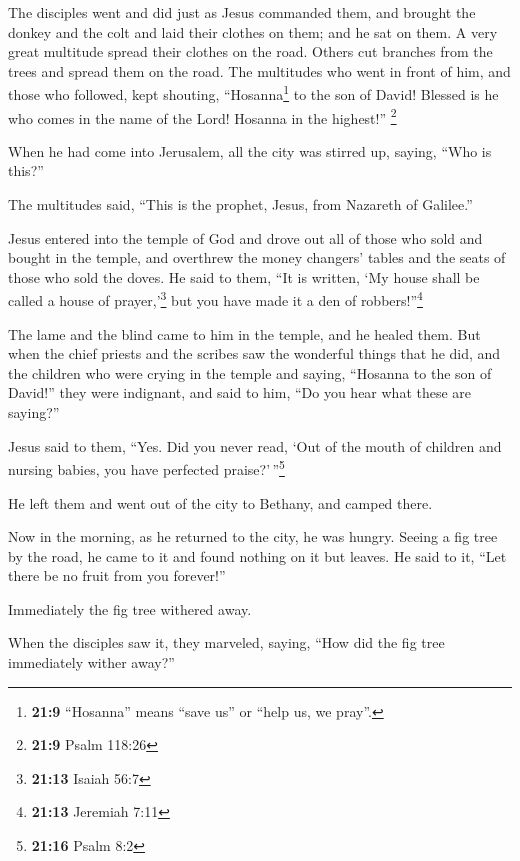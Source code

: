  The disciples went and did just as Jesus commanded them,
 and brought the donkey and the colt and laid their
clothes on them; and he sat on them.  A very great
multitude spread their clothes on the road. Others cut branches from the
trees and spread them on the road.  The multitudes who
went in front of him, and those who followed, kept shouting,
``Hosanna\footnote{\textbf{21:9} ``Hosanna'' means ``save us'' or ``help
  us, we pray''.} to the son of David! Blessed is he who comes in the
name of the Lord! Hosanna in the highest!'' \footnote{\textbf{21:9}
  Psalm 118:26}

 When he had come into Jerusalem, all the city was
stirred up, saying, ``Who is this?''

 The multitudes said, ``This is the prophet, Jesus, from
Nazareth of Galilee.''

 Jesus entered into the temple of God and drove out all
of those who sold and bought in the temple, and overthrew the money
changers' tables and the seats of those who sold the doves.
 He said to them, ``It is written, `My house shall be
called a house of prayer,'\footnote{\textbf{21:13} Isaiah 56:7} but you
have made it a den of robbers!''\footnote{\textbf{21:13} Jeremiah 7:11}

 The lame and the blind came to him in the temple, and he
healed them.  But when the chief priests and the scribes
saw the wonderful things that he did, and the children who were crying
in the temple and saying, ``Hosanna to the son of David!'' they were
indignant,  and said to him, ``Do you hear what these are
saying?''

Jesus said to them, ``Yes. Did you never read, `Out of the mouth of
children and nursing babies, you have perfected praise?'\,''\footnote{\textbf{21:16}
  Psalm 8:2}

 He left them and went out of the city to Bethany, and
camped there.

 Now in the morning, as he returned to the city, he was
hungry.  Seeing a fig tree by the road, he came to it and
found nothing on it but leaves. He said to it, ``Let there be no fruit
from you forever!''

Immediately the fig tree withered away.

 When the disciples saw it, they marveled, saying, ``How
did the fig tree immediately wither away?''


